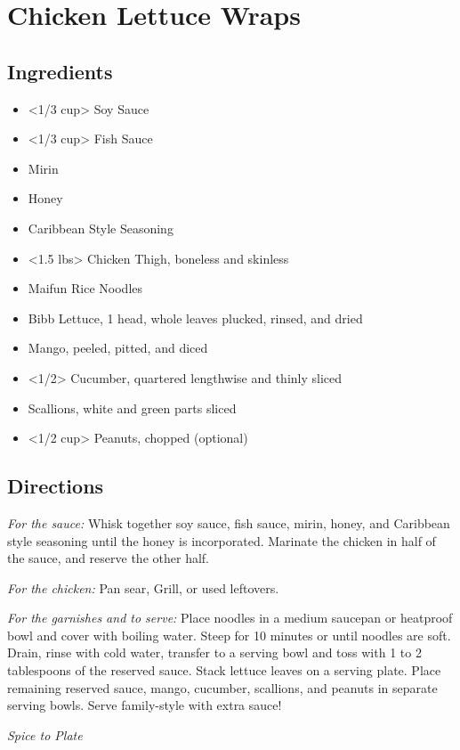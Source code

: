 \section{Chicken Lettuce Wraps}

\subsection{ Ingredients }

\begin{itemize}
  \item <1/3 cup> Soy Sauce
  \item <1/3 cup> Fish Sauce
  \item <3 tbs> Mirin
  \item <3 tbs> Honey
  \item <2 tbs> Caribbean Style Seasoning
  \item <1.5 lbs> Chicken Thigh, boneless and skinless 
  \item <4 oz> Maifun Rice Noodles
  \item <14 oz> Bibb Lettuce, 1 head, whole leaves plucked, rinsed, and dried
  \item <1> Mango, peeled, pitted, and diced
  \item <1/2> Cucumber, quartered lengthwise and thinly sliced
  \item <4> Scallions, white and green parts sliced
  \item <1/2 cup> Peanuts, chopped (optional)
\end{itemize}

\subsection{ Directions }

  \textit{For the sauce:} Whisk together soy sauce, fish sauce, mirin, honey, and Caribbean style seasoning until the honey is incorporated. Marinate the chicken in half of the sauce, and reserve the other half. 

  \textit{For the chicken:} Pan sear, Grill, or used leftovers.

  \textit{For the garnishes and to serve:} Place noodles in a medium saucepan or heatproof bowl and cover with boiling water. Steep for 10 minutes or until noodles are soft. Drain, rinse with cold water, transfer to a serving bowl and toss with 1 to 2 tablespoons of the reserved sauce. Stack lettuce leaves on a serving plate. Place remaining reserved sauce, mango, cucumber, scallions, and peanuts in separate serving bowls. Serve family-style with extra sauce!

\textit{Spice to Plate}
